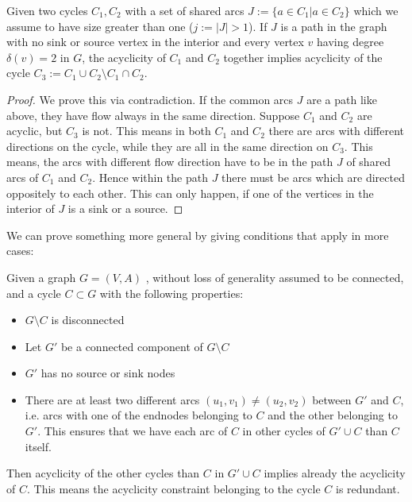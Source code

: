\begin{prop}
 Given two cycles $C_1, C_2$ with a set of shared arcs $J:=\{a\in C_1|a\in C_2\}$ which we assume to have size greater 
than one ($j:=|J|>1$). If $J$ is a path in the graph with no sink or source vertex in the interior and every vertex $v$
having degree $\delta(v)=2$ in $G$, the acyclicity of $C_1$ and $ C_2$ together implies acyclicity of the cycle 
$C_3:=C_1\cup C_2\setminus C_1\cap C_2$.
\end{prop}
\begin{proof}
 We prove this via contradiction. If the common arcs $J$ are a path like above, they have flow always in the same 
direction. Suppose $C_1$ and $C_2$ are acyclic, but $C_3$ is not. This means in both $C_1$ and $C_2$ there are arcs 
with different directions on the cycle, while they are all in the same direction on $C_3$. This means, the arcs with 
different flow direction have to be in the path $J$ of shared arcs of $C_1$ and $C_2$. Hence within the path $J$ there 
must be arcs which are directed oppositely to each other. This can only happen, if one of the vertices in the interior 
of $J$ is a sink or a source. \Lightning
\end{proof}
We can prove something more general by giving conditions that apply in more cases:
\begin{prop}
 Given a graph $G=(V,A)$ , without loss of generality assumed to be connected, and a cycle $C\subset G$ with the 
following properties:
 \begin{itemize}
  \item $G\setminus C$ is disconnected
  \item Let $G'$ be a connected component of $G\setminus C$ 
  \item $G'$ has no source or sink nodes
  \item There are at least two different arcs $(u_1,v_1) \neq (u_2,v_2)$ between $G'$ and $C$, i.e. arcs with one of 
    the endnodes belonging to $C$ and the other belonging to $G'$. This ensures that we have each arc of $C$ in other 
    cycles of $G'\cup C$ than $C$ itself.
 \end{itemize}
 Then acyclicity of the other cycles than $C$ in $G'\cup C$ implies already the acyclicity of $C$. This 
  means the acyclicity constraint belonging to the cycle $C$ is redundant. 
\end{prop}
